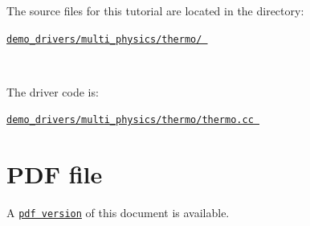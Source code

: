 \begin{DoxyItemize}
\item The source files for this tutorial are located in the directory\+:~\newline
~\newline
\begin{center} \href{
../../../../
demo_drivers/multi_physics/thermo/
}{\tt demo\+\_\+drivers/multi\+\_\+physics/thermo/ } \end{center} ~\newline

\item The driver code is\+: ~\newline
~\newline
\begin{center} \href{
../../../../
demo_drivers/multi_physics/thermo/thermo.cc
}{\tt demo\+\_\+drivers/multi\+\_\+physics/thermo/thermo.\+cc } \end{center} 
\end{DoxyItemize}



 

 \hypertarget{index_pdf}{}\section{P\+D\+F file}\label{index_pdf}
A \href{../latex/refman.pdf}{\tt pdf version} of this document is available. 
